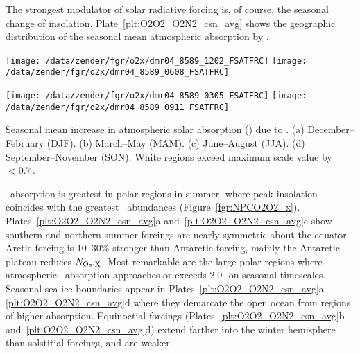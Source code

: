 \documentclass[agupp,twoside]{aguplus} %
\newlength{\fltwdtdblclm}\setlength{\fltwdtdblclm}{41.0pc} %
\begin{document}
The strongest modulator of solar radiative forcing is, of course, the
seasonal change of insolation.
Plate~\ref{plt:O2O2_O2N2_csn_avg} shows the geographic distribution
of the seasonal mean atmospheric absorption by \OdX.
\begin{plate*}
\begin{center}
\texttt{[image: /data/zender/fgr/o2x/dmr04\_8589\_1202\_FSATFRC]}%
\texttt{[image: /data/zender/fgr/o2x/dmr04\_8589\_0608\_FSATFRC]}%

\texttt{[image: /data/zender/fgr/o2x/dmr04\_8589\_0305\_FSATFRC]}%
\texttt{[image: /data/zender/fgr/o2x/dmr04\_8589\_0911\_FSATFRC]}%
\end{center}
\caption{
Seasonal mean increase in atmospheric solar absorption (\wxmS) due to \OdX. 
(a) December--February (DJF).
(b) March--May (MAM).
(c) June--August (JJA).
(d) September--November (SON).
White regions exceed maximum scale value by $< 0.7$\,\wxmS.
\label{plt:O2O2_O2N2_csn_avg}}
\end{plate*}
\OdX\ absorption is greatest in polar regions in summer, where peak
insolation coincides with the greatest \OdX\ abundances
(Figure~\ref{fgr:NPCO2O2_x}). 
Plates~\ref{plt:O2O2_O2N2_csn_avg}a and~\ref{plt:O2O2_O2N2_csn_avg}c
show southern and northern summer forcings are nearly symmetric
about the equator.
Arctic forcing is 10--30\% stronger than Antarctic forcing, mainly
the Antarctic plateau reduces $N_{\mathrm{O}_{2} \cdot \mathrm{X}}$.
Most remarkable are the large polar regions where atmospheric \OdX\
absorption approaches or exceeds 2.0\,\wxmS\ on seasonal timescales.  
Seasonal sea ice boundaries appear in
Plates~\ref{plt:O2O2_O2N2_csn_avg}a--\ref{plt:O2O2_O2N2_csn_avg}d
where they demarcate the open ocean from regions of higher absorption.  
Equinoctial forcings (Plates~\ref{plt:O2O2_O2N2_csn_avg}b
and~\ref{plt:O2O2_O2N2_csn_avg}d) extend farther into the winter
hemisphere than solstitial forcings, and are weaker.  
\end{document}

